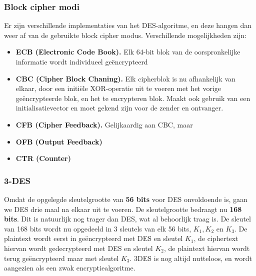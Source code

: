 \documentclass{report}
\begin{document}
	\subsubsection{Block cipher modi}
	Er zijn verschillende implementaties van het DES-algoritme, en deze hangen dan weer af van de gebruikte block cipher modus. Verschillende mogelijkheden zijn:
	\begin{itemize}
		\item \textbf{ECB (Electronic Code Book).} Elk 64-bit blok van de oorspronkelijke informatie wordt individueel geëncrypteerd
		\item \textbf{CBC (Cipher Block Chaning).} Elk cipherblok is nu afhankelijk van elkaar, door een initiële XOR-operatie uit te voeren met het vorige geëncrypteerde blok, en het te encrypteren blok. Maakt ook gebruik van een initialisatievector en moet gekend zijn voor de zender en ontvanger.
		\item \textbf{CFB (Cipher Feedback).} Gelijkaardig aan CBC, maar 
		\item \textbf{OFB (Output Feedback)} 
		\item \textbf{CTR (Counter)}
	\end{itemize}
	\subsubsection{3-DES}
	Omdat de opgelegde sleutelgrootte van \textbf{56 bits} voor DES onvoldoende is, gaan we DES drie maal na elkaar uit te voeren. De sleutelgrootte bedraagt nu \textbf{168 bits}. Dit is natuurlijk nog trager dan DES, wat al behoorlijk traag is. De sleutel van 168 bits wordt nu opgedeeld in 3 sleutels van elk 56 bits, $K_1, K_2$ en $K_3$. De plaintext wordt eerst in geëncrypteerd met DES en sleutel $K_1$, de ciphertext hiervan wordt gedecrypteerd met DES en sleutel $K_2$, de plaintext hiervan wordt terug geëncrypteerd maar met sleutel $K_3$. 3DES is nog altijd nutteloos, en wordt aangezien als een zwak encryptiealgoritme. 
\end{document}
